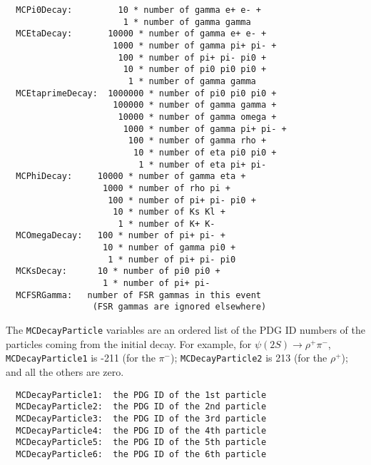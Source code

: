 \documentclass[11pt,a4paper]{define/cepcnote}
\begin{document}
\begin{verbatim}
  MCPi0Decay:         10 * number of gamma e+ e- +
                       1 * number of gamma gamma
  MCEtaDecay:       10000 * number of gamma e+ e- +
                     1000 * number of gamma pi+ pi- +
                      100 * number of pi+ pi- pi0 +
                       10 * number of pi0 pi0 pi0 +
                        1 * number of gamma gamma
  MCEtaprimeDecay:  1000000 * number of pi0 pi0 pi0 +
                     100000 * number of gamma gamma +
                      10000 * number of gamma omega +
                       1000 * number of gamma pi+ pi- +
                        100 * number of gamma rho +
                         10 * number of eta pi0 pi0 +
                          1 * number of eta pi+ pi-
  MCPhiDecay:     10000 * number of gamma eta +
                   1000 * number of rho pi +
                    100 * number of pi+ pi- pi0 +
                     10 * number of Ks Kl +
                      1 * number of K+ K-
  MCOmegaDecay:   100 * number of pi+ pi- +
                   10 * number of gamma pi0 +
                    1 * number of pi+ pi- pi0
  MCKsDecay:      10 * number of pi0 pi0 +
                   1 * number of pi+ pi-
  MCFSRGamma:   number of FSR gammas in this event
                 (FSR gammas are ignored elsewhere)
\end{verbatim}

The {\tt MCDecayParticle} variables are an ordered list of the PDG ID numbers of the particles coming from the initial decay.  For example, for $\psi(2S)\to\rho^+\pi^-$, {\tt MCDecayParticle1} is -211 (for the $\pi^-$); {\tt MCDecayParticle2} is 213 (for the $\rho^+$); and all the others are zero.

\begin{verbatim}
  MCDecayParticle1:  the PDG ID of the 1st particle
  MCDecayParticle2:  the PDG ID of the 2nd particle
  MCDecayParticle3:  the PDG ID of the 3rd particle
  MCDecayParticle4:  the PDG ID of the 4th particle
  MCDecayParticle5:  the PDG ID of the 5th particle
  MCDecayParticle6:  the PDG ID of the 6th particle
\end{verbatim}
\end{document}
